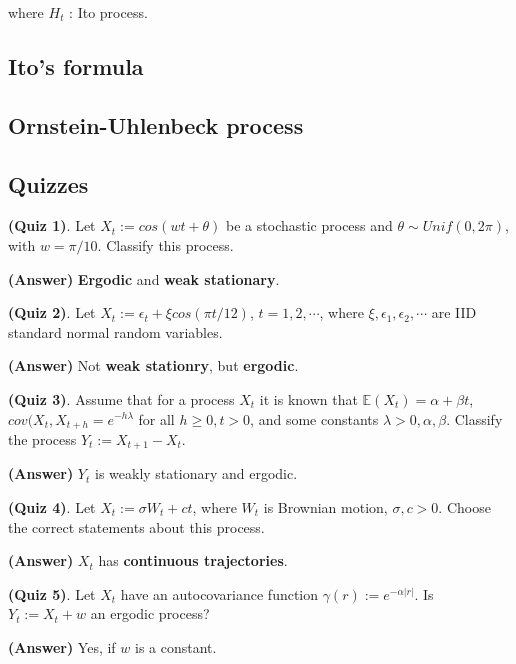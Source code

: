 \documentclass[12pt]{article}
\theoremstyle{nonumberbreak}
\begin{document}
where $H_t$ : Ito process. 



\subsection{Ito's formula}



\subsection{Ornstein-Uhlenbeck process}




\subsection*{Quizzes}


\textbf{(Quiz 1)}. Let $X_t := cos(wt + \theta)$ be a stochastic process and $\theta \sim Unif(0,2\pi)$, with $w=\pi/10$. Classify this process.

\textbf{(Answer)} \textbf{Ergodic} and \textbf{weak stationary}. 


\textbf{(Quiz 2)}. Let $X_t := \epsilon_t + \xi cos(\pi t/12)$, $t=1,2,\cdots$, where $\xi, \epsilon_1, \epsilon_2, \cdots$ are IID standard normal random variables.

\textbf{(Answer)} Not \textbf{weak stationry}, but \textbf{ergodic}.


\textbf{(Quiz 3)}. Assume that for a process $X_t$ it is known that $\mathbb{E} (X_t) = \alpha + \beta t$, $cov(X_t, X_{t+h} = e^{-h \lambda}$ for all $h \ge 0, t >0$, and some constants $\lambda >0, \alpha, \beta$. Classify the process $Y_t := X_{t+1} - X_t$. 

\textbf{(Answer)} $Y_t$ is weakly stationary and ergodic.


\textbf{(Quiz 4)}. Let $X_t := \sigma W_t + ct$, where $W_t$ is Brownian motion, $\sigma, c >0$. Choose the correct statements about this process. 

\textbf{(Answer)} $X_t$ has \textbf{continuous trajectories}. 


\textbf{(Quiz 5)}. Let $X_t$ have an autocovariance function $\gamma(r) := e^{-\alpha |r|}$. Is $Y_t := X_t + w$ an ergodic process?


\textbf{(Answer)} Yes, if $w$ is a constant. 
\end{document}
